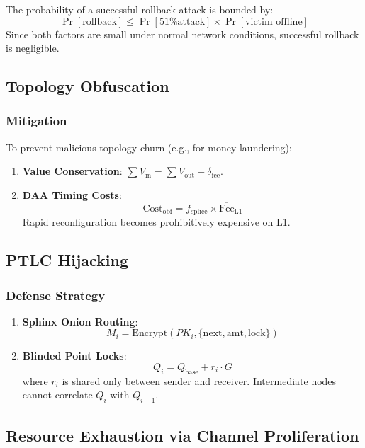 \begin{theorem}
The probability of a successful rollback attack is bounded by:
$$ \Pr[\text{rollback}] \le \Pr[\text{51\% attack}] \times \Pr[\text{victim offline}] $$
Since both factors are small under normal network conditions, successful rollback is negligible.
\end{theorem}

\subsection{Topology Obfuscation}

\subsubsection{Mitigation}
To prevent malicious topology churn (e.g., for money laundering):
\begin{enumerate}
    \item \textbf{Value Conservation}: $\sum V_{\mathrm{in}} = \sum V_{\mathrm{out}} + \delta_{\mathrm{fee}}$.
    \item \textbf{DAA Timing Costs}:
    $$ \mathrm{Cost}_{\mathrm{obf}} = f_{\mathrm{splice}} \times \overline{\mathrm{Fee}}_{\mathrm{L1}} $$
    Rapid reconfiguration becomes prohibitively expensive on L1.
\end{enumerate}

\subsection{PTLC Hijacking}

\subsubsection{Defense Strategy}
\begin{enumerate}
    \item \textbf{Sphinx Onion Routing}:
    $$ M_i = \mathrm{Encrypt}(PK_i, \{\mathrm{next}, \mathrm{amt}, \mathrm{lock}\}) $$
    \item \textbf{Blinded Point Locks}:
    $$ Q_i = Q_{\mathrm{base}} + r_i \cdot G $$
    where $r_i$ is shared only between sender and receiver. Intermediate nodes cannot correlate $Q_i$ with $Q_{i+1}$.
\end{enumerate}

\subsection{Resource Exhaustion via Channel Proliferation}

